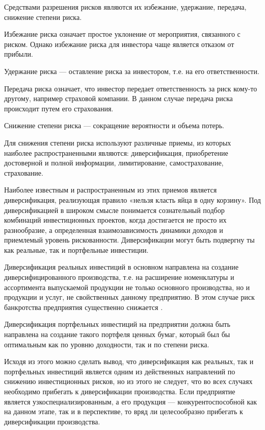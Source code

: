 Средствами разрешения рисков являются их избежание, удержание, передача, снижение степени риска.

Избежание риска означает простое уклонение от мероприятия, связанного с риском.
Однако избежание риска для инвестора чаще является отказом от прибыли.

Удержание риска --- оставление риска за инвестором, т.е. на его ответственности.

Передача риска означает, что инвестор передает ответственность за риск кому-то другому, например страховой компании.
В данном случае передача риска происходит путем его страхования.

Снижение степени риска — сокращение вероятности и объема потерь.

Для снижения степени риска используют различные приемы, из которых наиболее распространенными являются: диверсификация, приобретение достоверной и полной информации, лимитирование, самострахование, страхование.

Наиболее известным и распространенным из этих приемов является диверсификация, реализующая правило «нельзя класть яйца в одну корзину».
Под диверсификацией в широком смысле понимается сознательный подбор комбинаций инвестиционных проектов, когда достигается не просто их разнообразие, а определенная взаимозависимость динамики доходов и приемлемый уровень рискованности.
Диверсификации могут быть подвергну ты как реальные, так и портфельные инвестиции.

Диверсификация реальных инвестиций в основном направлена на создание диверсифицированного производства, т.е. на расширение номенклатуры и ассортимента выпускаемой продукции не только основного производства, но и продукции и услуг, не свойственных данному предприятию.
В этом случае риск банкротства предприятия существенно снижается  \cite[242]{sergeev}.

Диверсификация портфельных инвестиций на предприятии должна быть направлена на создание такого портфеля ценных бумаг, который был бы оптимальным как по уровню доходности, так и по степени риска.

Исходя из этого можно сделать вывод, что диверсификация как реальных, так и портфельных инвестиций является одним из действенных направлений по снижению инвестиционных рисков, но из этого не следует, что во всех случаях необходимо прибегать к диверсификации производства.
Если предприятие является узкоспециализированным, а его продукция --- конкурентоспособной как на данном этапе, так и в перспективе, то вряд ли целесообразно прибегать к диверсификации производства.

